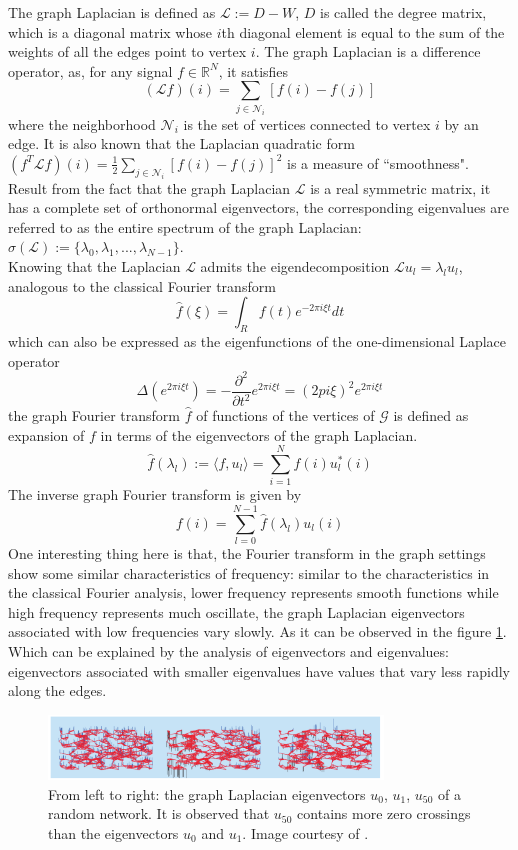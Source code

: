 \documentclass[conference]{IEEEtran}
\begin{document}
The graph Laplacian is defined as $\mathcal{L}:=D-W$, $D$ is called the degree matrix, which is a diagonal matrix whose $i$th diagonal element is equal to the sum of the weights of all the edges point to vertex $i$. The graph Laplacian is a difference operator, as, for any signal $f\in \mathbb{R}^N$, it satisfies
$$(\mathcal{L}f)(i)=\sum_{j\in\mathcal{N}_i}[f(i)-f(j)]$$
where the neighborhood $\mathcal{N}_i$ is the set of vertices connected to vertex $i$ by an edge. It is also known that the Laplacian quadratic form $(f^T\mathcal{L}f)(i)=\frac{1}{2}\sum_{j\in\mathcal{N}_i}[f(i)-f(j)]^2$ is a measure of ``smoothness".\\ 
Result from the fact that the graph Laplacian $\mathcal{L}$ is a real symmetric matrix, it has a complete set of orthonormal eigenvectors, the corresponding eigenvalues are referred to as the entire spectrum of the graph Laplacian: $\sigma(\mathcal{L}):=\{\lambda_0, \lambda_1, ..., \lambda_{N-1}\}$.\\
Knowing that the Laplacian $\mathcal{L}$ admits the eigendecomposition $\mathcal{L}u_{l}=\lambda_lu_l$, analogous to the classical Fourier transform
$$\hat{f}(\xi)=\int_Rf(t)e^{-2\pi i\xi t}dt$$
which can also be expressed as the eigenfunctions of the one-dimensional Laplace operator
$$\Delta(e^{2\pi i\xi t})=-\displaystyle\frac{\partial^2}{\partial t^2}e^{2\pi i \xi t} = (2pi\xi)^2e^{2\pi i\xi t}$$
the graph Fourier transform $\hat{f}$ of functions of the vertices of $\mathcal{G}$ is defined as expansion of $f$ in terms of the eigenvectors of the graph Laplacian. 
$$\hat{f}(\lambda_{l}):=\langle f, u_l\rangle=\sum_{i=1}^Nf(i)u_l^*(i)$$
The inverse graph Fourier transform is given by
$$f(i)=\sum_{l=0}^{N-1}\hat{f}(\lambda_l)u_l(i)$$
One interesting thing here is that, the Fourier transform in the graph settings show some similar characteristics of frequency: similar to the characteristics in the classical Fourier analysis, lower frequency represents smooth functions while high frequency represents much oscillate, the graph Laplacian eigenvectors associated with low frequencies vary slowly. As it can be observed in the figure \ref{2}. Which can be explained by the analysis of eigenvectors and eigenvalues: eigenvectors associated with smaller eigenvalues have values that vary less rapidly along the edges.
\begin{figure}[htbp]
\centerline{\includegraphics[width=3.5in]{2.png}}
\caption{From left to right: the graph Laplacian eigenvectors $u_0$, $u_1$, $u_{50}$ of a random network. It is observed that $u_{50}$ contains more zero crossings than the eigenvectors $u_0$ and $u_1$. Image courtesy of \cite{b1}.}
\label{2}
\end{figure}
\end{document}

